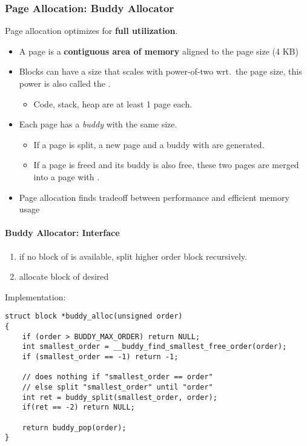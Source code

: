 \subsubsection{Page Allocation: Buddy Allocator}
Page allocation optimizes for \textbf{full utilization}.
\begin{itemize}
    \item A page is a \textbf{contiguous area of memory} aligned to the page size (4 KB)
    \item Blocks can have a size that scales with power-of-two wrt.\ the page size, this power is also called the .
          \begin{itemize}
              \item Code, stack, heap are at least 1 page each.
          \end{itemize}
    \item Each page has a \textit{buddy} with the same size.
          \begin{itemize}
              \item If a page is split, a new page and a buddy with  are generated.
              \item If a page is freed and its buddy is also free, these two pages are merged into a page with .
          \end{itemize}
    \item Page allocation finds tradeoff between performance and efficient memory usage
\end{itemize}

\paragraph{Buddy Allocator: Interface}
\begin{enumerate}
    \item if no block of  is available, split higher order block recursively.
    \item allocate block of desired 
\end{enumerate}

Implementation:
\begin{lstlisting}[style=bright_C++]
struct block *buddy_alloc(unsigned order)
{
    if (order > BUDDY_MAX_ORDER) return NULL;
    int smallest_order = __buddy_find_smallest_free_order(order);
    if (smallest_order == -1) return -1;

    // does nothing if "smallest_order == order"
    // else split "smallest_order" until "order"
    int ret = buddy_split(smallest_order, order);
    if(ret == -2) return NULL;

    return buddy_pop(order);
}
\end{lstlisting}

